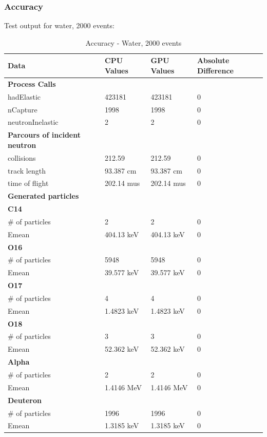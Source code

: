 \documentclass[12pt]{article}
\begin{document}
	\subsubsection{Accuracy}
	Test output for water, 2000 events:
		\begin{table}[H]
		\centering
		\caption{Accuracy - Water, 2000 events}\label{sys1Acc}
		\begin{tabular}{lp{2.3cm}p{2.3cm}l}
		\toprule
		\bf Data & \bf CPU Values & \bf GPU Values & \bf Absolute Difference\\\midrule
		\bf Process Calls&&&\\
		hadElastic&423181&423181&0\\
		nCapture&1998&1998&0\\
		neutronInelastic&2&2&0\\ 

		\midrule
		\bf Parcours of incident neutron&&&\\
		collisions&212.59&212.59&0\\
		track length&93.387 cm&93.387 cm&0\\
		time of flight&202.14 mus&202.14 mus&0\\
	
		\midrule
		\bf Generated particles&&&\\

		\bf{C14}&&&\\
		\# of particles&2&2&0\\
		Emean&404.13 keV&404.13 keV&0\\

		\bf{O16}&&&\\
		\# of particles&5948&5948&0\\
		Emean&39.577 keV&39.577 keV&0\\
		
		\bf{O17}&&&\\
		\# of particles&4&4&0\\
		Emean&1.4823 keV&1.4823 keV&0\\
		
		\bf{O18}&&&\\
		\# of particles&3&3&0\\
		Emean&52.362 keV&52.362 keV&0\\
		
		\bf{Alpha}&&&\\
		\# of particles&2&2&0\\
		Emean&1.4146 MeV&1.4146 MeV&0\\
		
		\bf{Deuteron}&&&\\
		\# of particles&1996&1996&0\\
		Emean&1.3185 keV&1.3185 keV&0\\
		

\end{tabular}
\end{table}
\end{document}
